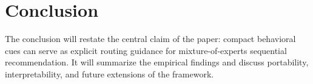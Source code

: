 \documentclass[sigconf,anonymous,review]{acmart}
\begin{document}
\section{Conclusion}
\label{sec:conclusion}
The conclusion will restate the central claim of the paper: compact behavioral cues can serve as explicit routing guidance for mixture-of-experts sequential recommendation. It will summarize the empirical findings and discuss portability, interpretability, and future extensions of the framework.



\end{document}
